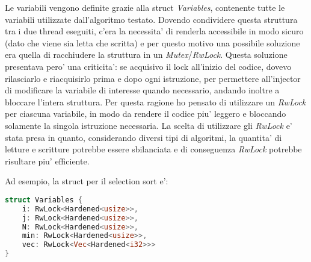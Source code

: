 Le variabili vengono definite grazie alla struct \textit{Variables}, contenente tutte le variabili utilizzate dall'algoritmo testato. Dovendo condividere questa struttura tra i due thread eseguiti, c'era la necessita' di renderla accessibile in modo sicuro (dato che viene sia letta che scritta) e per questo motivo una possibile soluzione era quella di racchiudere la struttura in un \textit{Mutex}/\textit{RwLock}. Questa soluzione presentava pero' una criticita': se acquisivo il lock all'inizio del codice, dovevo rilasciarlo e riacquisirlo prima e dopo ogni istruzione, per permettere all'injector di modificare la variabile di interesse quando necessario, andando inoltre a bloccare l'intera struttura. Per questa ragione ho pensato di utilizzare un \textit{RwLock} per ciascuna variabile, in modo da rendere il codice piu' leggero e bloccando solamente la singola istruzione necessaria. La scelta di utilizzare gli \textit{RwLock} e' stata presa in quanto, considerando diversi tipi di algoritmi, la quantita' di letture e scritture potrebbe essere sbilanciata e di conseguenza \textit{RwLock} potrebbe risultare piu' efficiente. %


Ad esempio, la struct per il selection sort e':

\begin{lstlisting}[language=Rust, style=boxed]
struct Variables {
    i: RwLock<Hardened<usize>>,
    j: RwLock<Hardened<usize>>,
    N: RwLock<Hardened<usize>>,
    min: RwLock<Hardened<usize>>,
    vec: RwLock<Vec<Hardened<i32>>>
}
\end{lstlisting}


\subsubsection{}
